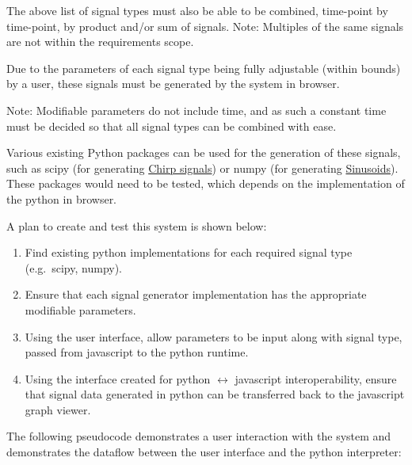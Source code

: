 \documentclass[
  english,
  paper=a4,
  oneside  ,captions=tableheading
]{scrbook}
\begin{document}
The above list of signal types must also be able to be combined,
time-point by time-point, by product and/or sum of signals. Note:
Multiples of the same signals are not within the requirements scope.

Due to the parameters of each signal type being fully adjustable (within
bounds) by a user, these signals must be generated by the system in
browser.

Note: Modifiable parameters do not include time, and as such a constant
time must be decided so that all signal types can be combined with ease.

Various existing Python packages can be used for the generation of these
signals, such as scipy (for generating
\href{https://docs.scipy.org/doc/scipy/reference/generated/scipy.signal.chirp.html\#scipy.signal.chirp}{Chirp
signals}) or numpy (for generating
\href{https://numpy.org/doc/stable/reference/generated/numpy.sin.html}{Sinusoids}).
These packages would need to be tested, which depends on the
implementation of the python in browser.

A plan to create and test this system is shown below:
\begin{enumerate}
	\item Find existing python implementations for each required signal type (e.g.~scipy, numpy). 
	\item Ensure that each signal generator implementation has the appropriate modifiable parameters. 
	\item Using the user interface, allow parameters to be input along with signal type, passed from javascript to the python runtime. 
	\item Using the interface created for python $\longleftrightarrow$ javascript interoperability, ensure that signal data generated in python can be transferred back to the javascript graph viewer.
\end{enumerate}

The following pseudocode demonstrates a user interaction with the system
and demonstrates the dataflow between the user interface and the python
interpreter:
\end{document}

